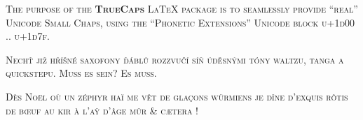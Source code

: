 \documentclass{scrartcl}
\begin{document}
\textsc{The purpose of the \textbf{TrueCaps} LaTeX package is to seamlessly provide “real” 
Unicode Small Chaps, using the “Phonetic Extensions” Unicode block u+1d00 .. u+1d7f.}

\textsc{Nechť již hříšné saxofony ďáblů rozzvučí síň úděsnými tóny waltzu, tanga a quickstepu. Muß es sein? Es muss.}

\textsc{Dès Noël où un zéphyr haï me vêt de glaçons würmiens je dîne d’exquis rôtis de bœuf au kir à l’aÿ d’âge mûr \& cætera !}
\end{document}
